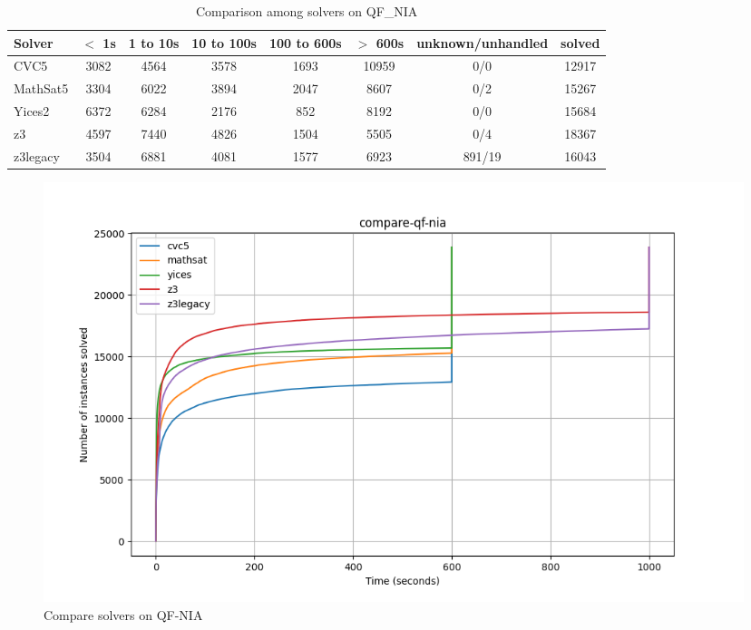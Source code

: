 \begin{table}
  \begin{tabular}{|l|c|c|c|c|c|c|c|}
    \hline
    Solver & $<$ 1s & 1 to 10s & 10 to 100s & 100 to 600s & $>$ 600s & unknown/unhandled & solved \\
    \hline
    CVC5 & 3082 & 4564 & 3578 & 1693 & 10959 & 0/0 & 12917 \\
    \hline
    MathSat5 & 3304 & 6022 & 3894 & 2047 & 8607 & 0/2 & 15267 \\
    \hline
    Yices2 & 6372 & 6284 & 2176 & 852 & 8192 & 0/0 & 15684 \\
    \hline
    z3 & 4597 & 7440 & 4826 & 1504 & 5505 & 0/4 & 18367 \\
    \hline
    z3legacy & 3504 & 6881 & 4081 & 1577 & 6923 & 891/19 & 16043 \\
    \hline
    \end{tabular}
  \caption{Comparison among solvers on QF\_NIA \label{tab:compare-qf-nia}}
\end{table}

\begin{figure}[htbp]
  \centering
  \includegraphics[width=0.99\textwidth]{../data/compare-qf-nia.png}
  \caption{Compare solvers on QF-NIA }
  \label{fig:compare-qf-nia}
\end{figure}


